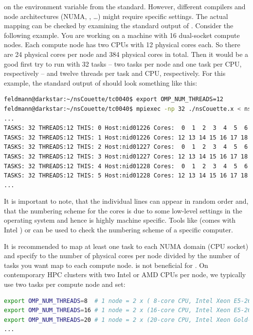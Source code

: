 \documentclass[a4paper, 11pt, DIV=11]{scrartcl}
\begin{document}
on the  environment variable from the
\omp standard. However, different compilers and node architectures (NUMA, \hyperthreading,
\dots) might require specific settings. The actual mapping can be checked by examining the
standard output of \nsc. Consider the following example. You are working on a machine with
\num{16} dual-socket compute nodes. Each compute node has two CPUs with \num{12} physical
cores each. So there are \num{24} physical cores per node and \num{384} physical cores in 
total. Then it would be a good first try to run \nsc with \num{32} \mpi tasks -- \ie two tasks 
per node and one task per CPU, respectively -- and twelve \omp threads per \mpi task and CPU, 
respectively. For this example, the standard output of \nsc should look something like this:
\begin{lstlisting}[language=bash]
feldmann@darkstar:~/nsCouette/tc0040$ export OMP_NUM_THREADS=12
feldmann@darkstar:~/nsCouette/tc0040$ mpiexec -np 32 ./nsCouette.x < nsCouette.in
...
TASKS: 32 THREADS:12 THIS: 0 Host:nid01226 Cores:  0  1  2  3  4  5  6  7  8  9 10 11
TASKS: 32 THREADS:12 THIS: 1 Host:nid01226 Cores: 12 13 14 15 16 17 18 19 20 21 22 23
TASKS: 32 THREADS:12 THIS: 2 Host:nid01227 Cores:  0  1  2  3  4  5  6  7  8  9 10 11
TASKS: 32 THREADS:12 THIS: 3 Host:nid01227 Cores: 12 13 14 15 16 17 18 19 20 21 22 23
TASKS: 32 THREADS:12 THIS: 4 Host:nid01228 Cores:  0  1  2  3  4  5  6  7  8  9 10 11
TASKS: 32 THREADS:12 THIS: 5 Host:nid01228 Cores: 12 13 14 15 16 17 18 19 20 21 22 23
...
\end{lstlisting}
It is important to note, that the individual lines can appear in random order and, that the 
numbering scheme for the cores is due to some low-level settings in the operating system and 
hence is highly machine specific. Tools like  (comes with Intel \mpi) or 
\href{http://code.google.com/p/likwid}{} can be used to check the 
numbering scheme of a specific computer.
\par
It is recommended to map at least one \mpi task to each NUMA domain (CPU socket) and specify 
 to the number of physical cores per node divided by the number of \mpi
tasks you want map to each compute node. \hyperthreading is not beneficial for 
\nsc. On contemporary HPC clusters with two Intel or AMD CPUs per node, we typically use two 
\mpi tasks per compute node and set:
\begin{lstlisting}[language=bash]
export OMP_NUM_THREADS=8  # 1 node = 2 x ( 8-core CPU, Intel Xeon E5-2670, SandyBridge)
export OMP_NUM_THREADS=16 # 1 node = 2 x (16-core CPU, Intel Xeon E5-2698v3, Haswell)
export OMP_NUM_THREADS=20 # 1 node = 2 x (20-core CPU, Intel Xeon Gold-6148, Skylake) 
...
\end{lstlisting}
\end{document}
